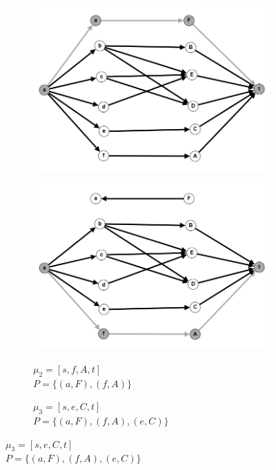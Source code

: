 \documentclass{article}
\begin{document}
\begin{enumerate}
\begin{figure}
\begin{subfigure}[t]{0.32\textwidth}
        \includegraphics[width=\textwidth]{attachments/10/1.png}
         \label{fig:10_1}
     \end{subfigure}
     \hfill
     \begin{subfigure}[t]{0.32\textwidth}
        \centering
         \caption*{\small{$\mu_2 = [s, f, A, t]$\\$P =\{(a,F),(f,A)\}$}}
         \includegraphics[width=\textwidth]{attachments/10/2.png}
         \label{fig:10_2}
     \end{subfigure}
     \hfill
     \begin{subfigure}[t]{0.32\textwidth}
        \centering
         \caption*{\small{$\mu_3 = [s, e, C, t]$\\$P =\{(a,F),(f,A),(e, C)\}$}}

\end{subfigure}
\end{figure}
\end{enumerate}
\end{document}
